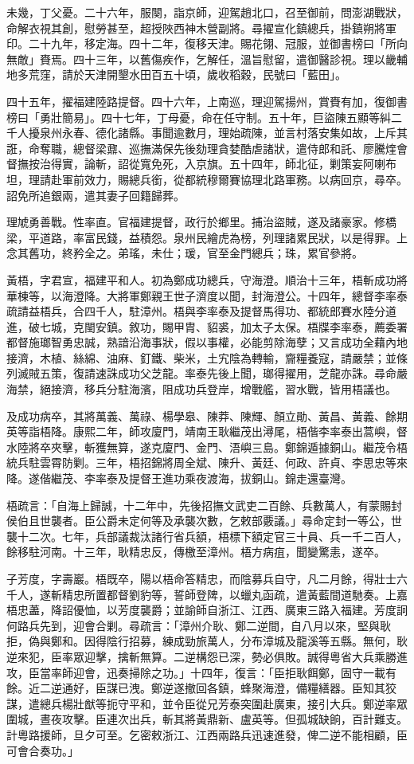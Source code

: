 \begin{pinyinscope}
未幾，丁父憂。二十六年，服闋，詣京師，迎駕趙北口，召至御前，問澎湖戰狀，命解衣視其創，慰勞甚至，超授陜西神木營副將。尋擢宣化鎮總兵，掛鎮朔將軍印。二十九年，移定海。四十二年，復移天津。賜花翎、冠服，並御書榜曰「所向無敵」賚焉。四十三年，以舊傷疾作，乞解任，溫旨慰留，遣御醫診視。理以畿輔地多荒窪，請於天津開墾水田百五十頃，歲收稻穀，民號曰「藍田」。

四十五年，擢福建陸路提督。四十六年，上南巡，理迎駕揚州，賞賚有加，復御書榜曰「勇壯簡易」。四十七年，丁母憂，命在任守制。五十年，巨盜陳五顯等糾二千人擾泉州永春、德化諸縣。事聞逾數月，理始疏陳，並言村落安集如故，上斥其誑，命奪職，總督梁鼐、巡撫滿保先後劾理貪婪酷虐諸狀，遣侍郎和託、廖騰煃會督撫按治得實，論斬，詔從寬免死，入京旗。五十四年，師北征，剿策妄阿喇布坦，理請赴軍前效力，賜總兵銜，從都統穆爾賽協理北路軍務。以病回京，尋卒。詔免所追銀兩，遣其妻子回籍歸葬。

理虓勇善戰。性率直。官福建提督，政行於鄉里。捕治盜賊，遂及諸豪家。修橋梁，平道路，率富民錢，益積怨。泉州民繪虎為榜，列理諸累民狀，以是得罪。上念其舊功，終矜全之。弟瑤，未仕；瑗，官至金門總兵；珠，累官參將。

黃梧，字君宣，福建平和人。初為鄭成功總兵，守海澄。順治十三年，梧斬成功將華棟等，以海澄降。大將軍鄭親王世子濟度以聞，封海澄公。十四年，總督李率泰疏請益梧兵，合四千人，駐漳州。梧與李率泰及提督馬得功、都統郎賽水陸分道進，破七城，克閩安鎮。敘功，賜甲胄、貂裘，加太子太保。梧牒李率泰，薦委署都督施瑯智勇忠誠，熟諳沿海事狀，假以事權，必能剪除海孽；又言成功全藉內地接濟，木植、絲綿、油麻、釘鐵、柴米，土宄陰為轉輸，齎糧養寇，請嚴禁；並條列滅賊五策，復請速誅成功父芝龍。率泰先後上聞，瑯得擢用，芝龍亦誅。尋命嚴海禁，絕接濟，移兵分駐海濱，阻成功兵登岸，增戰艦，習水戰，皆用梧議也。

及成功病卒，其將萬義、萬祿、楊學皋、陳莽、陳輝、顏立勛、黃昌、黃義、餘期英等詣梧降。康熙二年，師攻廈門，靖南王耿繼茂出潯尾，梧偕李率泰出蒿嶼，督水陸將卒夾擊，斬獲無算，遂克廈門、金門、浯嶼三島。鄭錦遁據銅山。繼茂令梧統兵駐雲霄防剿。三年，梧招錦將周全斌、陳升、黃廷、何政、許貞、李思忠等來降。遂偕繼茂、李率泰及提督王進功乘夜渡海，拔銅山。錦走還臺灣。

梧疏言：「自海上歸誠，十二年中，先後招撫文武吏二百餘、兵數萬人，有蒙賜封侯伯且世襲者。臣公爵未定何等及承襲次數，乞敕部覈議。」尋命定封一等公，世襲十二次。七年，兵部議裁汰諸行省兵額，梧標下額定官三十員、兵一千二百人，餘移駐河南。十三年，耿精忠反，傳檄至漳州。梧方病疽，聞變驚恚，遂卒。

子芳度，字壽巖。梧既卒，陽以梧命答精忠，而陰募兵自守，凡二月餘，得壯士六千人，遂斬精忠所置都督劉豹等，誓師登陴，以蠟丸函疏，遣黃藍間道馳奏。上嘉梧忠藎，降詔優恤，以芳度襲爵；並諭師自浙江、江西、廣東三路入福建。芳度詗何路兵先到，迎會合剿。尋疏言：「漳州介耿、鄭二逆間，自八月以來，堅與耿拒，偽與鄭和。因得陰行招募，練成勁旅萬人，分布漳城及龍溪等五縣。無何，耿逆來犯，臣率眾迎擊，擒斬無算。二逆構怨已深，勢必俱敗。誠得粵省大兵乘勝進攻，臣當率師迎會，迅奏掃除之功。」十四年，復言：「臣拒耿餌鄭，固守一載有餘。近二逆通好，臣謀已洩。鄭逆遂撤回各鎮，蜂聚海澄，備糧繕器。臣知其狡謀，遣總兵楊壯猷等扼守平和，並令臣從兄芳泰突圍赴廣東，接引大兵。鄭逆率眾圍城，晝夜攻擊。臣連次出兵，斬其將黃鼎新、盧英等。但孤城缺餉，百計難支。計粵路援師，旦夕可至。乞密敕浙江、江西兩路兵迅速進發，俾二逆不能相顧，臣可會合奏功。」


\end{pinyinscope}
